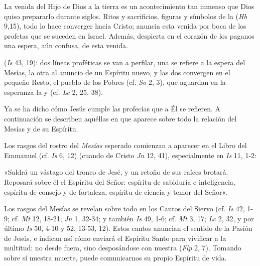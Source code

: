 

\begin{ccebody}
	
	
	 La venida del Hijo de Dios a la tierra es un acontecimiento tan inmenso que Dios quiso prepararlo durante siglos. Ritos y sacrificios, figuras y símbolos de la  (\emph{Hb} 9,15), todo lo hace converger hacia Cristo; anuncia esta venida por boca de los profetas que se suceden en Israel. Además, despierta en el corazón de los paganos una espera, aún confusa, de esta venida.
	
	
	  (\emph{Is} 43, 19): dos líneas proféticas se van a perfilar, una se refiere a la espera del Mesías, la otra al anuncio de un Espíritu nuevo, y las dos convergen en el pequeño Resto, el pueblo de los Pobres (cf. \emph{So} 2, 3), que aguardan en la esperanza la  y  (cf. \emph{Lc} 2, 25. 38).
	
	Ya se ha dicho cómo Jesús cumple las profecías que a Él se refieren. A continuación se describen aquéllas en que aparece sobre todo la relación del Mesías y de su Espíritu.
	
	 Los rasgos del rostro del \emph{Mesías} esperado comienzan a aparecer en el Libro del Emmanuel (cf. \emph{Is} 6, 12) (cuando  de Cristo \emph{Jn} 12, 41), especialmente en \emph{Is} 11, 1-2:
	
	\begin{cceprose}
			«Saldrá un vástago del tronco de Jesé, 
			y un retoño de sus raíces brotará. 			
			Reposará sobre él el Espíritu del Señor: 			
			espíritu de sabiduría e inteligencia, 			
			espíritu de consejo y de fortaleza, 
			espíritu de ciencia y temor del Señor».
	\end{cceprose}
	

	
	 Los rasgos del Mesías se revelan sobre todo en los Cantos del Siervo (cf. \emph{Is} 42, 1-9; cf. \emph{Mt} 12, 18-21; \emph{Jn} 1, 32-34; y también \emph{Is} 49, 1-6; cf. \emph{Mt} 3, 17; \emph{Lc} 2, 32, y por último \emph{Is} 50, 4-10 y 52, 13-53, 12). Estos cantos anuncian el sentido de la Pasión de Jesús, e indican así cómo enviará el Espíritu Santo para vivificar a la multitud: no desde fuera, sino desposándose con nuestra  (\emph{Flp} 2, 7). Tomando sobre sí nuestra muerte, puede comunicarnos su propio Espíritu de vida.
	

\end{ccebody}
